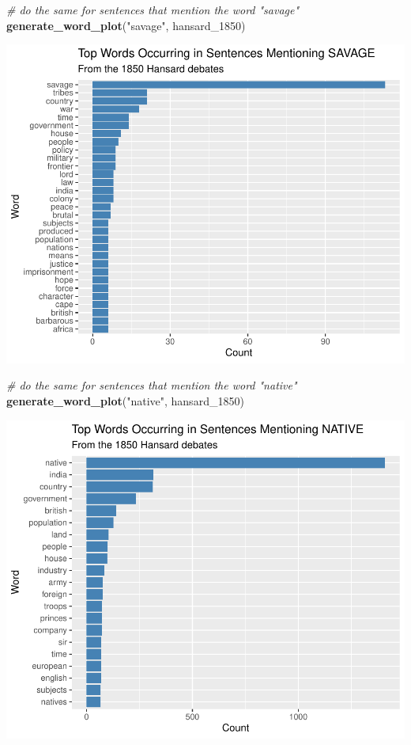 \documentclass[
]{article}
\newenvironment{Shaded}{\begin{snugshade}}{\end{snugshade}}
\newcommand{\CommentTok}[1]{\textcolor[rgb]{0.56,0.35,0.01}{\textit{#1}}}
\newcommand{\FunctionTok}[1]{\textcolor[rgb]{0.13,0.29,0.53}{\textbf{#1}}}
\newcommand{\NormalTok}[1]{#1}
\newcommand{\StringTok}[1]{\textcolor[rgb]{0.31,0.60,0.02}{#1}}
\begin{document}
\begin{Shaded}
\begin{Highlighting}[]
\CommentTok{\# do the same for sentences that mention the word "savage"}
\FunctionTok{generate\_word\_plot}\NormalTok{(}\StringTok{"savage"}\NormalTok{, hansard\_1850)}
\end{Highlighting}
\end{Shaded}

\includegraphics[width=0.8\linewidth]{ch1-11.25.2024_files/figure-latex/unnamed-chunk-41-1}

\begin{Shaded}
\begin{Highlighting}[]
\CommentTok{\# do the same for sentences that mention the word "native"}
\FunctionTok{generate\_word\_plot}\NormalTok{(}\StringTok{"native"}\NormalTok{, hansard\_1850)}
\end{Highlighting}
\end{Shaded}

\includegraphics[width=0.8\linewidth]{ch1-11.25.2024_files/figure-latex/unnamed-chunk-42-1}
\end{document}
